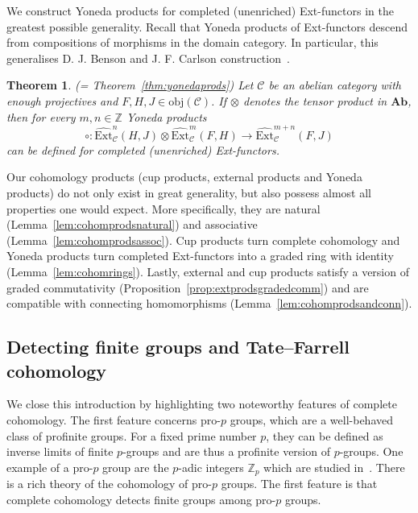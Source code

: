 \documentclass[12pt, a4paper]{article}
\numberwithin{equation}{section}
\newtheorem{thm}{Theorem}[section]
\theoremstyle{empty}
\theoremstyle{nonumberplain}
\begin{document}
We construct Yoneda products for completed (unenriched) Ext-functors in the greatest possible generality. Recall that Yoneda products of Ext-functors descend from compositions of morphisms in the domain category. In particular, this generalises D.\! J.\! Benson and J.\! F.\! Carlson construction~\cite[p.~110]{ben92}.

\begin{thm}
(= Theorem~\ref{thm:yonedaprods}) Let $\mathcal{C}$ be an abelian category with enough projectives and $F, H, J \in \mathrm{obj}(\mathcal{C})$. If $\otimes$ denotes the tensor product in $\mathbf{Ab}$, then for every $m, n \in \mathbb{Z}$ Yoneda products
    \[ \circ: \widehat{\mathrm{Ext}}_{\mathcal{C}}^n(H, J) \otimes \widehat{\mathrm{Ext}}_{\mathcal{C}}^m(F, H) \rightarrow \widehat{\mathrm{Ext}}_{\mathcal{C}}^{m+n}(F, J) \]
    can be defined for completed (unenriched) Ext-functors.
\end{thm}

Our cohomology products (cup products, external products and Yoneda products) do not only exist in great generality, but also possess almost all properties one would expect. More specifically, they are natural (Lemma~\ref{lem:cohomprodsnatural}) and associative (Lemma~\ref{lem:cohomprodsassoc}). Cup products turn complete cohomology and Yoneda products turn completed Ext-functors into a graded ring with identity (Lemma~\ref{lem:cohomrings}). Lastly, external and cup products satisfy a version of graded commutativity (Proposition~\ref{prop:extprodsgradedcomm}) and are compatible with connecting homomorphisms (Lemma~\ref{lem:cohomprodsandconn}).

\subsection{Detecting finite groups and Tate--Farrell cohomology}\label{subsec:varia}

We close this introduction by highlighting two noteworthy features of complete cohomology. The first feature concerns pro-$p$ groups, which are a well-behaved class of profinite groups. For a fixed prime number $p$, they can be defined as inverse limits of finite $p$-groups and are thus a profinite version of $p$-groups. One example of a pro-$p$ group are the $p$-adic integers $\mathbb{Z}_p$ which are studied in~\cite[Section~1.5]{wil98}. There is a rich theory of the cohomology of pro-$p$ groups. The first feature is that complete cohomology detects finite groups among pro-$p$ groups.
\end{document}
